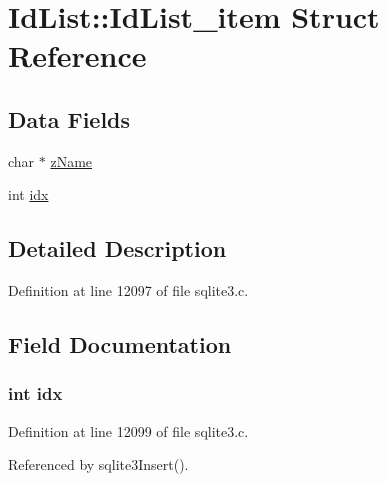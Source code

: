 \hypertarget{struct_id_list_1_1_id_list__item}{}\section{Id\+List\+:\+:Id\+List\+\_\+item Struct Reference}
\label{struct_id_list_1_1_id_list__item}
\subsection*{Data Fields}
\begin{DoxyCompactItemize}
\item 
char $\ast$ \hyperlink{struct_id_list_1_1_id_list__item_a661118d86ac4127d40bf3be78d92117d}{z\+Name}
\item 
int \hyperlink{struct_id_list_1_1_id_list__item_ae40354a1051342eb5a9db005715dcfa9}{idx}
\end{DoxyCompactItemize}


\subsection{Detailed Description}


Definition at line 12097 of file sqlite3.\+c.



\subsection{Field Documentation}
\hypertarget{struct_id_list_1_1_id_list__item_ae40354a1051342eb5a9db005715dcfa9}{}
\subsubsection[{idx}]{\setlength{\rightskip}{0pt plus 5cm}int idx}\label{struct_id_list_1_1_id_list__item_ae40354a1051342eb5a9db005715dcfa9}


Definition at line 12099 of file sqlite3.\+c.



Referenced by sqlite3\+Insert().

\hypertarget{struct_id_list_1_1_id_list__item_a661118d86ac4127d40bf3be78d92117d}{}
